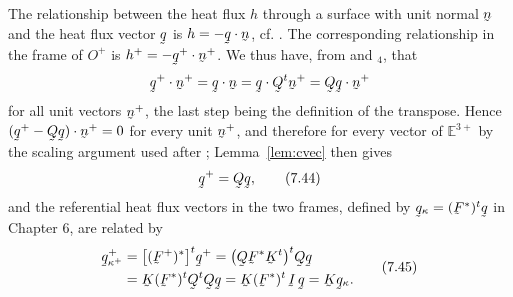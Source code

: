 The relationship between the heat flux $h$ through a surface with unit
normal $\bn$ and the heat flux vector $\bq$ is $h=-\ip\bq\bn$, cf.
. The corresponding relationship in the frame of $O^{+}$ is
$h^{+}=-\ip{\bq^{+}}{\bn^{+}}$. We thus have, from  and
$_{4}$, that
\[
   \ip{\bq^{+}}{\bn^{+}}=\ip\bq\bn=\ip\bq{\bQ^{t}\bn^{+}}
   =\ip{\bQ\bq}{\bn^{+}}
\]
for all unit vectors $\bn^{+}$, the last step being the definition of the
transpose. Hence $\ip{(\bq^{+}-\bQ\bq)}{\bn^{+}}=0$ for every unit
$\bn^{+}$, and therefore for every vector of $\mathbb{E}^{3+}$ by the
scaling argument used after ; Lemma~\ref{lem:cvec} then gives
\begin{equation}
   \bq^{+}=\bQ\bq ,
   \tag{7.44}\label{eq:7.44}
\end{equation}
and the referential heat flux vectors in the two frames, defined by
$\bq_{\kappa}=(\bF^{*})^{t}\bq$ in Chapter 6, are related by
\begin{equation}
\begin{aligned}
   \bq^{+}_{\kappa^{+}}&=\big[(\bF^{+})^{*}\big]^{t}\bq^{+}
    =\big(\bQ\bF^{*}\bK^{t}\big)^{t}\bQ\bq\\
   &=\bK(\bF^{*})^{t}\bQ^{t}\bQ\bq=\bK(\bF^{*})^{t}\,\I\,\bq
    =\bK\bq_{\kappa}.
\end{aligned}
   \tag{7.45}\label{eq:7.45}
\end{equation}


